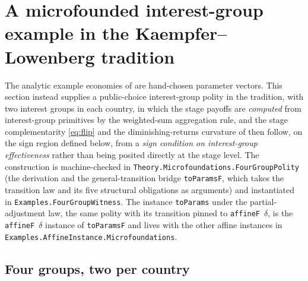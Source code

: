 \section{A microfounded interest-group example in the
Kaempfer--Lowenberg tradition}
\label{app:fourgroup}

The analytic example economies of  are hand-chosen
parameter vectors. This section instead supplies a
public-choice interest-group polity in the \citet{Kaempfer1988} tradition,
with two interest groups in each country, in which the stage payoffs are
\emph{computed} from interest-group primitives by the
\citet{GrossmanHelpman1994} weighted-sum aggregation rule, and the
stage complementarity \eqref{eq:flip} and the diminishing-returns
curvature of  then follow, on the sign region
defined below, from a \emph{sign condition on interest-group effectiveness}
rather than being posited directly at the stage level. The
construction is machine-checked in
\texttt{Theory.Microfoundations.FourGroupPolity} (the derivation and the
general-transition bridge \texttt{toParamsF}, which takes the transition law
and its five structural obligations as arguments) and instantiated in
\texttt{Examples.FourGroupWitness}.  The instance \texttt{toParams} under the partial-adjustment law, the
same polity with its transition pinned to \texttt{affineF}~$\delta$, is the
\texttt{affineF}~$\delta$ instance of \texttt{toParamsF} and lives with the other affine
instances in \texttt{Examples.AffineInstance.Microfoundations}.

\subsection{Four groups, two per country}
\label{sec:fourgroup:primitives}

